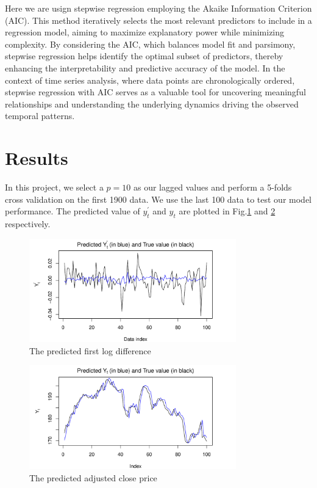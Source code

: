 \documentclass[conference,onecolumn,11pt]{IEEEtran}
\begin{document}
Here we are usign stepwise regression employing the Akaike Information Criterion (AIC). This method iteratively selects the most relevant predictors to include in a regression model, aiming to maximize explanatory power while minimizing complexity. By considering the AIC, which balances model fit and parsimony, stepwise regression helps identify the optimal subset of predictors, thereby enhancing the interpretability and predictive accuracy of the model. In the context of time series analysis, where data points are chronologically ordered, stepwise regression with AIC serves as a valuable tool for uncovering meaningful relationships and understanding the underlying dynamics driving the observed temporal patterns.


\section{Results}

In this project, we select a $p=10$ as our lagged values and perform a 5-folds cross validation on the first 1900 data. We use the last 100 data to test our model performance. The predicted value of  $y^{'}_t$ and $y_t$ are plotted in Fig.\ref{fig:pred_dprice} and \ref{fig:pred_price} respectively.

\begin{figure}[htpb]
	\centering
	\includegraphics[width=0.8\textwidth]{pic/Predicted_dAdjColsed.pdf}
	\caption{The predicted first log difference}
	\label{fig:pred_dprice}
\end{figure}

\begin{figure}[htpb]
	\centering
	\includegraphics[width=0.8\textwidth]{pic/Predicted_AdjColsed.pdf}
	\caption{The predicted adjusted close price}
	\label{fig:pred_price}
\end{figure}
\end{document}
